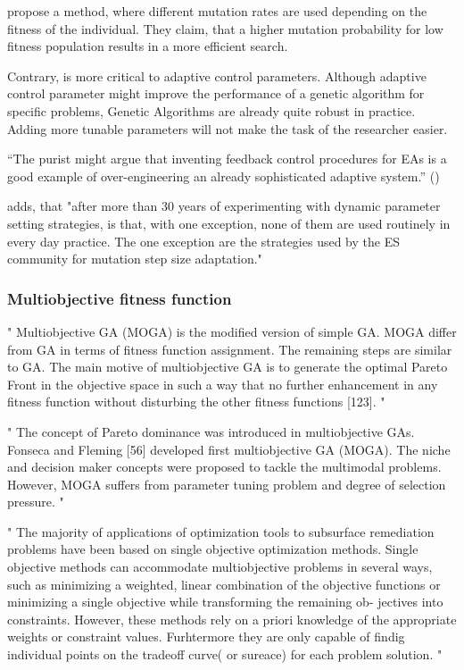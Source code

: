 \cite{marsili_libelli_adaptive_2000} propose a method, where different mutation rates are used depending on the fitness of the individual. They claim, that a higher mutation probability for low fitness population results in a more efficient search.

Contrary, \cite{kacprzyk_parameter_2007} is more critical to adaptive control parameters. Although adaptive control parameter might improve the performance of a genetic algorithm for specific problems, Genetic Algorithms are already quite robust in practice. Adding more tunable parameters will not make the task of the researcher easier.

\enquote{The purist might argue that inventing feedback control procedures for EAs is a good example of over-engineering an already sophisticated adaptive system.} (\cite{kacprzyk_parameter_2007})

\cite{kacprzyk_parameter_2007} adds, that "after more than 30 years of experimenting with dynamic parameter setting strategies, is that, with one exception, none of them are used routinely in every day practice. The one exception are the strategies used by the ES community for mutation step size adaptation."

\iffalse
\subsubsection{Multiobjective fitness function}

"
Multiobjective GA (MOGA) is the modified version of simple GA. MOGA differ from GA in terms of fitness function assignment. The remaining steps are similar to GA. The main motive of multiobjective GA is to generate the optimal Pareto Front in the objective space in such a way that no further enhancement in any fitness function without disturbing the other fitness functions [123].
"\cite{katoch_review_2021}


"
The concept of Pareto dominance was introduced in multiobjective GAs. Fonseca and Fleming [56] developed first multiobjective GA (MOGA). The niche and decision maker concepts were proposed to tackle the multimodal problems. However, MOGA suffers from parameter tuning problem and degree of selection pressure.
"\cite{katoch_review_2021}

"
The majority of applications of optimization tools to subsurface remediation problems have been based on single objective optimization methods. Single objective methods can accommodate multiobjective problems in several ways, such as minimizing a weighted, linear combination of the objective functions or minimizing a single objective while transforming the remaining ob- jectives into constraints. However, these methods rely on a priori knowledge of the appropriate weights or constraint values. Furhtermore they are only capable of findig individual points on the tradeoff curve( or sureace) for each problem solution.
"\cite{erickson_multi-objective_2002}

